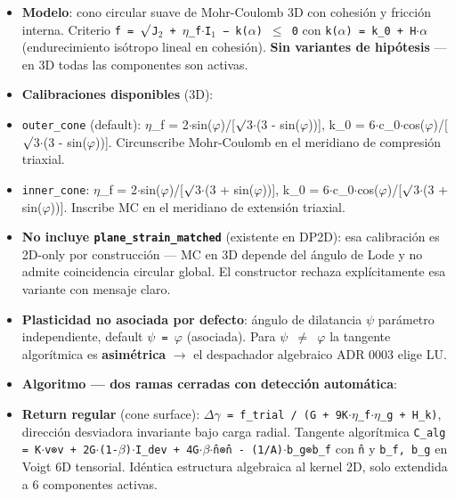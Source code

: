 \documentclass[11pt,letterpaper,oneside]{report}
\begin{document}
\begin{itemize}
  \item \textbf{Modelo}: cono circular suave de Mohr-Coulomb 3D con cohesión y fricción interna. Criterio \texttt{f = \ensuremath{\surd}J\ensuremath{_{2}} + \ensuremath{\eta}\_f\ensuremath{\cdot}I\ensuremath{_{1}} − k(\ensuremath{\alpha}) \ensuremath{\le} 0} con \texttt{k(\ensuremath{\alpha}) = k\_0 + H\ensuremath{\cdot}\ensuremath{\alpha}} (endurecimiento isótropo lineal en cohesión). \textbf{Sin variantes de hipótesis} --- en 3D todas las componentes son activas.
  \item \textbf{Calibraciones disponibles} (3D):
  \item \texttt{outer\_cone} (default): \ensuremath{\eta}\_f = 2\ensuremath{\cdot}sin(\ensuremath{\varphi})/[\ensuremath{\surd}3\ensuremath{\cdot}(3 - sin(\ensuremath{\varphi}))], k\_0 = 6\ensuremath{\cdot}c\_0\ensuremath{\cdot}cos(\ensuremath{\varphi})/[\ensuremath{\surd}3\ensuremath{\cdot}(3 - sin(\ensuremath{\varphi}))]. Circunscribe Mohr-Coulomb en el meridiano de compresión triaxial.
  \item \texttt{inner\_cone}: \ensuremath{\eta}\_f = 2\ensuremath{\cdot}sin(\ensuremath{\varphi})/[\ensuremath{\surd}3\ensuremath{\cdot}(3 + sin(\ensuremath{\varphi}))], k\_0 = 6\ensuremath{\cdot}c\_0\ensuremath{\cdot}cos(\ensuremath{\varphi})/[\ensuremath{\surd}3\ensuremath{\cdot}(3 + sin(\ensuremath{\varphi}))]. Inscribe MC en el meridiano de extensión triaxial.
  \item \textbf{No incluye \texttt{plane\_strain\_matched}} (existente en DP2D): esa calibración es 2D-only por construcción --- MC en 3D depende del ángulo de Lode y no admite coincidencia circular global. El constructor rechaza explícitamente esa variante con mensaje claro.
  \item \textbf{Plasticidad no asociada por defecto}: ángulo de dilatancia \texttt{\ensuremath{\psi}} parámetro independiente, default \texttt{\ensuremath{\psi} = \ensuremath{\varphi}} (asociada). Para \texttt{\ensuremath{\psi} \ensuremath{\neq} \ensuremath{\varphi}} la tangente algorítmica es \textbf{asimétrica} \ensuremath{\to} el despachador algebraico ADR 0003 elige LU.
  \item \textbf{Algoritmo --- dos ramas cerradas con detección automática}:
  \item \textbf{Return regular} (cone surface): \texttt{\ensuremath{\Delta}\ensuremath{\gamma} = f\_trial / (G + 9K\ensuremath{\cdot}\ensuremath{\eta}\_f\ensuremath{\cdot}\ensuremath{\eta}\_g + H\_k)}, dirección desviadora invariante bajo carga radial. Tangente algorítmica \texttt{C\_alg = K\ensuremath{\cdot}v⊗v + 2G\ensuremath{\cdot}(1-\ensuremath{\beta})\ensuremath{\cdot}I\_dev + 4G\ensuremath{\cdot}\ensuremath{\beta}\ensuremath{\cdot}n̂⊗n̂ - (1/A)\ensuremath{\cdot}b\_g⊗b\_f} con \texttt{n̂} y \texttt{b\_f, b\_g} en Voigt 6D tensorial. Idéntica estructura algebraica al kernel 2D, solo extendida a 6 componentes activas.

\end{itemize}
\end{document}
